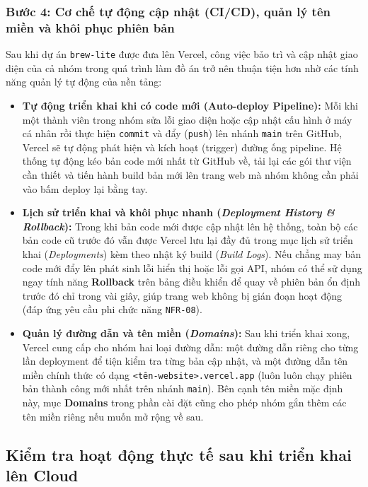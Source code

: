 \subsubsection{Bước 4: Cơ chế tự động cập nhật (CI/CD), quản lý tên miền và khôi phục phiên bản}
Sau khi dự án \texttt{brew-lite} được đưa lên Vercel, công việc bảo trì và cập nhật giao diện của cả nhóm trong quá trình làm đồ án trở nên thuận tiện hơn nhờ các tính năng quản lý tự động của nền tảng:
\begin{itemize}
    \item \textbf{Tự động triển khai khi có code mới (Auto-deploy Pipeline):} Mỗi khi một thành viên trong nhóm sửa lỗi giao diện hoặc cập nhật cấu hình ở máy cá nhân rồi thực hiện \texttt{commit} và đẩy (\texttt{push}) lên nhánh \texttt{main} trên GitHub, Vercel sẽ tự động phát hiện và kích hoạt (trigger) đường ống pipeline. Hệ thống tự động kéo bản code mới nhất từ GitHub về, tải lại các gói thư viện cần thiết và tiến hành build bản mới lên trang web mà nhóm không cần phải vào bấm deploy lại bằng tay.
    \item \textbf{Lịch sử triển khai và khôi phục nhanh (\textit{Deployment History \& Rollback}):} Trong khi bản code mới được cập nhật lên hệ thống, toàn bộ các bản code cũ trước đó vẫn được Vercel lưu lại đầy đủ trong mục lịch sử triển khai (\textit{Deployments}) kèm theo nhật ký build (\textit{Build Logs}). Nếu chẳng may bản code mới đẩy lên phát sinh lỗi hiển thị hoặc lỗi gọi API, nhóm có thể sử dụng ngay tính năng \textbf{Rollback} trên bảng điều khiển để quay về phiên bản ổn định trước đó chỉ trong vài giây, giúp trang web không bị gián đoạn hoạt động (đáp ứng yêu cầu phi chức năng \texttt{NFR-08}).
    \item \textbf{Quản lý đường dẫn và tên miền (\textit{Domains}):} Sau khi triển khai xong, Vercel cung cấp cho nhóm hai loại đường dẫn: một đường dẫn riêng cho từng lần deployment để tiện kiểm tra từng bản cập nhật, và một đường dẫn tên miền chính thức có dạng \texttt{<tên-website>.vercel.app} (luôn luôn chạy phiên bản thành công mới nhất trên nhánh \texttt{main}). Bên cạnh tên miền mặc định này, mục \textbf{Domains} trong phần cài đặt cũng cho phép nhóm gắn thêm các tên miền riêng nếu muốn mở rộng về sau.
\end{itemize}

\subsection{Kiểm tra hoạt động thực tế sau khi triển khai lên Cloud}

